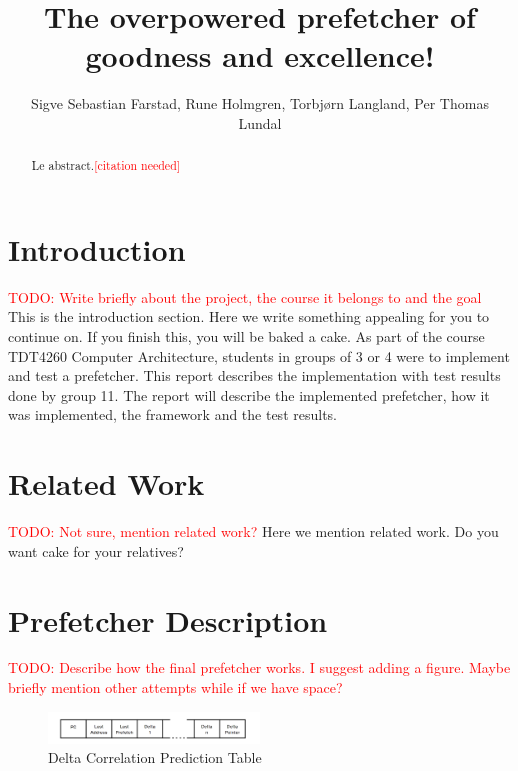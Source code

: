 \documentclass[a4paper]{IEEEtran}
\title{The overpowered prefetcher of goodness and excellence!}
\author{
    Sigve Sebastian Farstad,
    Rune Holmgren,
    Torbjørn Langland,
    Per Thomas Lundal
}
\newcommand\TODO[1]{\textcolor{red}{TODO:#1}}
\newcommand\todo[1]{\TODO{#1}}
\newcommand\cn{\textcolor{red}{[citation needed]}}
\begin{document}
\maketitle

\begin{abstract}
    Le abstract.\cn
\end{abstract}

\section{Introduction}

\todo{ Write briefly about the project, the course it belongs to and the goal}
\break
This is the introduction section. Here we write something appealing for you to continue on. If you finish this, you will be baked a cake.
\break
\break
As part of the course TDT4260 Computer Architecture, students in groups of 3 or 4 were to implement and test a prefetcher. This report describes the implementation with test results done by group 11. The report will describe the implemented prefetcher, how it was implemented, the framework and the test results.

\section{Related Work}
\todo{ Not sure, mention related work?}
\break
Here we mention related work. Do you want cake for your relatives?
\section{Prefetcher Description}
\todo{ Describe how the final prefetcher works. I suggest adding a figure. Maybe briefly mention other attempts while if we have space?}
\break

\begin{figure}[h!]
  \centering
      \includegraphics[width=0.5\textwidth]{Figures/DCTable}
  \caption{Delta Correlation Prediction Table}
  \label{fig:DCTable}
\end{figure}
\end{document}

